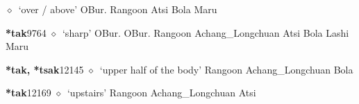 \begin{list}{}{\leftmargin=1.5em \itemindent=-1.5em}
\hspace{1ex}
         $\diamond$~`over / above'
         OBur. 
\hspace{1ex}
         Rangoon 
\hspace{1ex}
         Atsi 
\hspace{1ex}
         Bola 
\hspace{1ex}
         Maru 
  \item {\footnotesize \textbf{*tak}}{\tiny 9764}
\hspace{1ex}
         $\diamond$~`sharp'
         OBur. 
\hspace{1ex}
         OBur. 
\hspace{1ex}
         Rangoon 
\hspace{1ex}
         Achang\_Longchuan 
\hspace{1ex}
         Atsi 
\hspace{1ex}
         Bola 
\hspace{1ex}
         Lashi 
\hspace{1ex}
         Maru 
  \item {\footnotesize \textbf{*tak, *tsak}}{\tiny 12145}
\hspace{1ex}
         $\diamond$~`upper half of the body'
         Rangoon 
\hspace{1ex}
         Achang\_Longchuan 
\hspace{1ex}
         Bola 
  \item {\footnotesize \textbf{*tak}}{\tiny 12169}
\hspace{1ex}
         $\diamond$~`upstairs'
         Rangoon 
\hspace{1ex}
         Achang\_Longchuan 
\hspace{1ex}
         Atsi 
\hspace{1ex}

\end{list}
